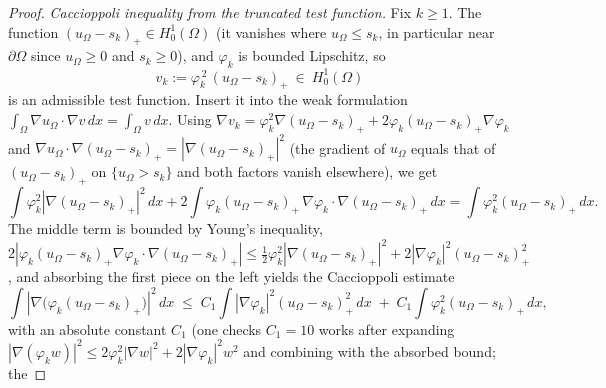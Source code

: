 \documentclass[11pt]{amsart}
\theoremstyle{definition}
\newcommand{\Om}{\Omega}
\newcommand{\abs}[1]{\left|#1\right|}
\newcommand{\dx}{\,dx}
\begin{document}
\begin{proof}
\smallskip
\emph{Caccioppoli inequality from the truncated test function.}
Fix $k\ge1$. The function $(u_\Om-s_k)_+\in H^1_0(\Om)$ (it vanishes
where $u_\Om\le s_k$, in particular near $\partial\Om$ since $u_\Om\ge0$
and $s_k\ge0$), and $\varphi_k$ is bounded Lipschitz, so
\[
   v_k:=\varphi_k^{\,2}\,(u_\Om-s_k)_+\ \in\ H^1_0(\Om)
\]
is an admissible test function.
Insert it into the weak formulation
$\int_\Om\nabla u_\Om\cdot\nabla v\dx=\int_\Om v\dx$. Using
$\nabla v_k=\varphi_k^2\nabla(u_\Om-s_k)_+
+2\varphi_k(u_\Om-s_k)_+\nabla\varphi_k$ and
$\nabla u_\Om\cdot\nabla(u_\Om-s_k)_+=\abs{\nabla(u_\Om-s_k)_+}^2$ (the
gradient of $u_\Om$ equals that of $(u_\Om-s_k)_+$ on $\{u_\Om>s_k\}$ and
both factors vanish elsewhere), we get
\[
   \int\varphi_k^2\abs{\nabla(u_\Om-s_k)_+}^2\dx
   +2\int\varphi_k(u_\Om-s_k)_+\,\nabla\varphi_k\cdot\nabla(u_\Om-s_k)_+\dx
   =\int\varphi_k^2(u_\Om-s_k)_+\dx .
\]
The middle term is bounded by Young's inequality,
$2\abs{\varphi_k(u_\Om-s_k)_+\nabla\varphi_k\cdot\nabla(u_\Om-s_k)_+}
\le\tfrac12\varphi_k^2\abs{\nabla(u_\Om-s_k)_+}^2
+2\abs{\nabla\varphi_k}^2(u_\Om-s_k)_+^2$,
and absorbing the first piece on the left yields the Caccioppoli
estimate
\begin{equation}\label{eq:caccioppoli}
   \int\abs{\nabla\bigl(\varphi_k(u_\Om-s_k)_+\bigr)}^2\dx
   \;\le\;C_1\!\int\abs{\nabla\varphi_k}^2(u_\Om-s_k)_+^2\dx
        \;+\;C_1\!\int\varphi_k^2(u_\Om-s_k)_+\dx,
\end{equation}
with an absolute constant $C_1$ (one checks $C_1=10$ works after expanding
$\abs{\nabla(\varphi_k w)}^2\le2\varphi_k^2\abs{\nabla w}^2
+2\abs{\nabla\varphi_k}^2 w^2$ and combining with the absorbed bound; the

\end{proof}
\end{document}

